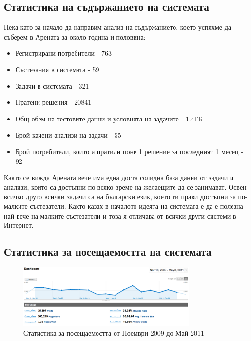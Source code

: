 \documentclass[a4paper,12pt]{article}
\begin{document}
  \subsection{Статистика на съдържанието на системата}
  Нека като за начало да направим анализ на съдържанието, което успяхме да съберем в Арената за около година и половина:
  
  \begin{itemize}
    \item Регистрирани потребители - 763
    \item Състезания в системата - 59
    \item Задачи в системата - 321
    \item Пратени решения - 20841
    \item Общ обем на тестовите данни и условията на задачите - 1.4ГБ
    \item Брой качени анализи на задачи - 55
    \item Брой потребители, които а пратили поне 1 решение за последният 1 месец - 92
  \end{itemize}
  
  Както се вижда Арената вече има една доста солидна база данни от задачи и анализи, които са достъпни по всяко време на желаещите да се занимават. Освен всичко друго всички задачи са на български език, което ги прави достъпни за по-малките състезатели. Както казах в началото идеята на системата е да е полезна най-вече на малките състезатели и това я отличава от всички други системи в Интернет.
  
  \pagebreak
  
  \subsection{Статистика за посещаемостта на системата}
  \begin{figure}
    \begin{center}
      \includegraphics[width=0.8\textwidth]{images/visitors_stats.png}
    \end{center}
    \caption{Статистика за посещаемостта от Ноември 2009 до Май 2011}
    \label{visitors_stats}
  \end{figure}
  
\end{document}

